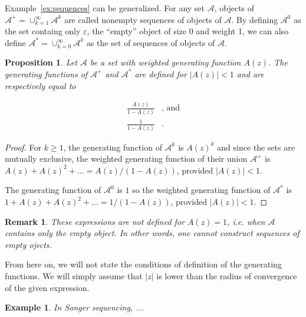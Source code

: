 \documentclass{article}
\newtheorem{example}{Example}
\newtheorem{proposition}{Proposition}
\newtheorem{remark}{Remark}
\begin{document}
Example~\ref{ex:sequences} can be generalized. For any set $\mathcal{A}$,
objects of $\mathcal{A}^+ = \cup_{k=1}^\infty\mathcal{A}^k$ are called
nonempty sequences of objects of $\mathcal{A}$. By defining
$\mathcal{A}^0$ as the set containg only $\varepsilon$, the ``empty''
object of size 0 and weight 1, we can also define $\mathcal{A}^* =
\cup_{k=0}^\infty\mathcal{A}^k$ as the set of sequences of objects of
$\mathcal{A}$.

\begin{proposition}
Let $\mathcal{A}$ be a set with weighted generating function $A(z)$. The
generating functions of $\mathcal{A}^+$ and $\mathcal{A}^*$ are defined
for $|A(z)| < 1$ and are respectively equal to

\begin{equation*}
\begin{split}
\frac{A(z)}{1-A(z)}&\text{, and} \\
\frac{1}{1-A(z)}&.
\end{split}
\end{equation*}
\end{proposition}

\begin{proof}
For $k \geq 1$, the generating function of $\mathcal{A}^k$ is $A(z)^k$ and
since the sets are mutually exclusive, the weighted generating function of
their union $\mathcal{A}^+$ is $A(z) + A(z)^2 + \ldots = A(z) / (1-A(z))$,
provided $|A(z)| < 1$.

The generating function of $\mathcal{A}^0$ is $1$ so the weighted
generating function of $\mathcal{A}^*$ is $1 + A(z) + A(z)^2 + \ldots =
1 / (1-A(z))$, provided $|A(z)| < 1$.
\end{proof}

\begin{remark}
These expressions are not defined for $A(z) = 1$, \textit{i.e.} when
$\mathcal{A}$ contains only the empty object. In other words, one cannot
construct sequences of empty ojects.
\end{remark}

From here on, we will not state the conditions of definition of the
generating functions. We will simply assume that $|z|$ is lower than the
radius of convergence of the given expression.

\begin{example}
In Sanger sequencing, ...
\end{example}


\end{document}
